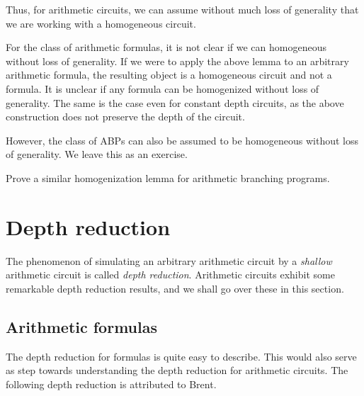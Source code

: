 Thus, for arithmetic circuits, we can assume without much loss of generality that we are working with a homogeneous circuit. 

\begin{remark*}
For the class of arithmetic formulas, it is not clear if we can homogeneous without loss of generality. If we were to apply the above lemma to an arbitrary arithmetic formula, the resulting object is a homogeneous circuit and not a formula. It is unclear if any formula can be homogenized without loss of generality. The same is the case even for constant depth circuits, as the above construction does not preserve the depth of the circuit. 

However, the class of ABPs can also be assumed to be homogeneous without loss of generality. We leave this as an exercise. 
\end{remark*}

\begin{exercise}
Prove a similar homogenization lemma for arithmetic branching programs. 
\end{exercise}

\section{Depth reduction}

The phenomenon of simulating an arbitrary arithmetic circuit by a \emph{shallow} arithmetic circuit is called \emph{depth reduction}. Arithmetic circuits exhibit some remarkable depth reduction results, and we shall go over these in this section. 

\subsection{Arithmetic formulas}

The depth reduction for formulas is quite easy to describe. This would also serve as step towards understanding the depth reduction for arithmetic circuits. The following depth reduction is attributed to Brent. 

